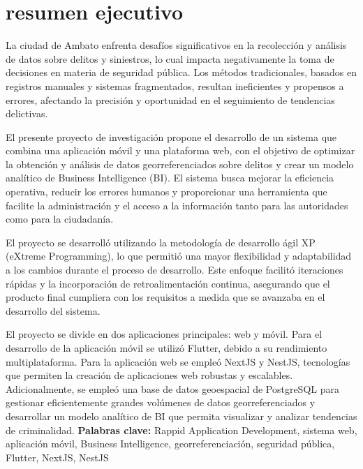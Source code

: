 \chapter*{resumen ejecutivo}
La ciudad de Ambato enfrenta desafíos significativos en la recolección y análisis de datos sobre
delitos y siniestros, lo cual impacta negativamente la toma de decisiones en materia de seguridad
pública. Los métodos tradicionales, basados en registros manuales y sistemas fragmentados, resultan
ineficientes y propensos a errores, afectando la precisión y oportunidad en el seguimiento de
tendencias delictivas.
\bigbreak

El presente proyecto de investigación propone el desarrollo de un sistema que combina una aplicación
móvil y una plataforma web, con el objetivo de optimizar la obtención y análisis de datos georreferenciados
sobre delitos y crear un modelo analítico de Business Intelligence (BI). El sistema busca mejorar
la eficiencia operativa, reducir los errores humanos y proporcionar una herramienta que facilite la
administración y el acceso a la información tanto para las autoridades como para la ciudadanía.
\bigbreak

El proyecto se desarrolló utilizando la metodología de desarrollo ágil XP (eXtreme Programming), lo
que permitió una mayor flexibilidad y adaptabilidad a los cambios durante el proceso de desarrollo.
Este enfoque facilitó iteraciones rápidas y la incorporación de retroalimentación continua, asegurando
que el producto final cumpliera con los requisitos a medida que se avanzaba en el desarrollo del sistema.
\bigbreak

El proyecto se divide en dos aplicaciones principales: web y móvil. Para el desarrollo de la aplicación
móvil se utilizó Flutter, debido a su rendimiento multiplataforma. Para la aplicación web se empleó
NextJS y NestJS, tecnologías que permiten la creación de aplicaciones web robustas y escalables.
Adicionalmente, se empleó una base de datos geoespacial de PostgreSQL para gestionar eficientemente
grandes volúmenes  de datos georreferenciados y desarrollar un modelo analítico de BI que permita
visualizar y analizar tendencias de criminalidad.
\vfill
\textbf{Palabras clave:} Rappid Application Development, sistema web, aplicación móvil, Business Intelligence,
georreferenciación, seguridad pública, Flutter, NextJS, NestJS
